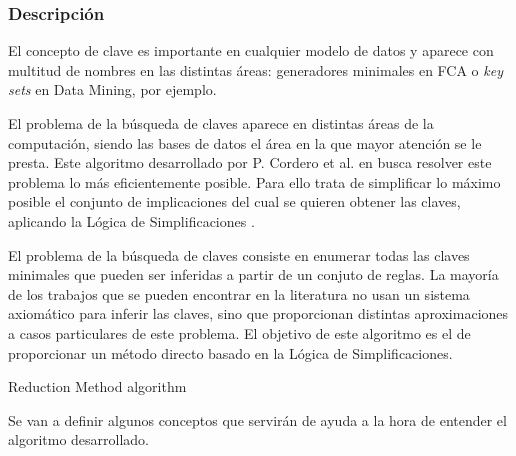 \subsubsection{Descripci\'on} 

El concepto de clave es importante en cualquier modelo de datos y aparece con multitud de nombres en las distintas \'areas: generadores minimales en FCA o \textit{key sets} en Data Mining, por ejemplo.

El problema de la b\'usqueda de claves aparece en distintas \'areas de la computaci\'on, siendo las bases de datos el \'area en la que mayor atenci\'on se le presta. Este algoritmo desarrollado por P. Cordero et al. en  \cite{Reduction} busca resolver este problema lo m\'as eficientemente posible. Para ello trata de simplificar lo m\'aximo posible el conjunto de implicaciones del cual se quieren obtener las claves, aplicando la L\'ogica de Simplificaciones \cite{Cordero2002}.

El problema de la b\'usqueda de claves consiste en enumerar todas las claves minimales que pueden ser inferidas a partir de un conjuto de reglas. La mayor\'ia de los trabajos que se pueden encontrar en la literatura no usan un sistema axiom\'atico para inferir las claves, sino que proporcionan distintas aproximaciones a casos particulares de este problema. El objetivo de este algoritmo es el de proporcionar un m\'etodo directo basado en la L\'ogica de Simplificaciones.\\

\IncMargin{1em}
\begin{algorithm}[H]
    \SetAlgoLined
    \DontPrintSemicolon
    \caption{Reduction Method algorithm}\label{alg:3}
\end{algorithm}\DecMargin{1em}
\newpage
Se van a definir algunos conceptos que servir\'an de ayuda a la hora de entender el algoritmo desarrollado.\\

